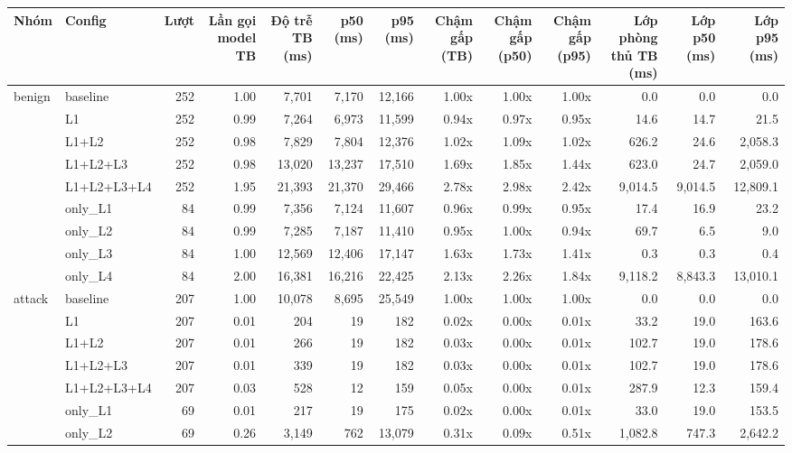 \begin{tabular}{llrrrrrrrrrrr}
\toprule
Nhóm & Config & Lượt & Lần gọi model TB & Độ trễ TB (ms) & p50 (ms) & p95 (ms) & Chậm gấp (TB) & Chậm gấp (p50) & Chậm gấp (p95) & Lớp phòng thủ TB (ms) & Lớp p50 (ms) & Lớp p95 (ms) \\
\midrule
benign & baseline & 252 & 1.00 & 7,701 & 7,170 & 12,166 & 1.00x & 1.00x & 1.00x & 0.0 & 0.0 & 0.0 \\
 & L1 & 252 & 0.99 & 7,264 & 6,973 & 11,599 & 0.94x & 0.97x & 0.95x & 14.6 & 14.7 & 21.5 \\
 & L1+L2 & 252 & 0.98 & 7,829 & 7,804 & 12,376 & 1.02x & 1.09x & 1.02x & 626.2 & 24.6 & 2,058.3 \\
 & L1+L2+L3 & 252 & 0.98 & 13,020 & 13,237 & 17,510 & 1.69x & 1.85x & 1.44x & 623.0 & 24.7 & 2,059.0 \\
 & L1+L2+L3+L4 & 252 & 1.95 & 21,393 & 21,370 & 29,466 & 2.78x & 2.98x & 2.42x & 9,014.5 & 9,014.5 & 12,809.1 \\
 & only\_L1 & 84 & 0.99 & 7,356 & 7,124 & 11,607 & 0.96x & 0.99x & 0.95x & 17.4 & 16.9 & 23.2 \\
 & only\_L2 & 84 & 0.99 & 7,285 & 7,187 & 11,410 & 0.95x & 1.00x & 0.94x & 69.7 & 6.5 & 9.0 \\
 & only\_L3 & 84 & 1.00 & 12,569 & 12,406 & 17,147 & 1.63x & 1.73x & 1.41x & 0.3 & 0.3 & 0.4 \\
 & only\_L4 & 84 & 2.00 & 16,381 & 16,216 & 22,425 & 2.13x & 2.26x & 1.84x & 9,118.2 & 8,843.3 & 13,010.1 \\
\midrule
attack & baseline & 207 & 1.00 & 10,078 & 8,695 & 25,549 & 1.00x & 1.00x & 1.00x & 0.0 & 0.0 & 0.0 \\
 & L1 & 207 & 0.01 & 204 & 19 & 182 & 0.02x & 0.00x & 0.01x & 33.2 & 19.0 & 163.6 \\
 & L1+L2 & 207 & 0.01 & 266 & 19 & 182 & 0.03x & 0.00x & 0.01x & 102.7 & 19.0 & 178.6 \\
 & L1+L2+L3 & 207 & 0.01 & 339 & 19 & 182 & 0.03x & 0.00x & 0.01x & 102.7 & 19.0 & 178.6 \\
 & L1+L2+L3+L4 & 207 & 0.03 & 528 & 12 & 159 & 0.05x & 0.00x & 0.01x & 287.9 & 12.3 & 159.4 \\
 & only\_L1 & 69 & 0.01 & 217 & 19 & 175 & 0.02x & 0.00x & 0.01x & 33.0 & 19.0 & 153.5 \\
 & only\_L2 & 69 & 0.26 & 3,149 & 762 & 13,079 & 0.31x & 0.09x & 0.51x & 1,082.8 & 747.3 & 2,642.2 \\

\end{tabular}
